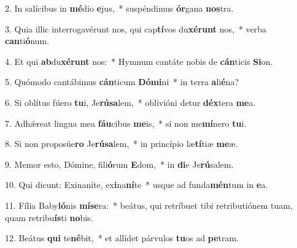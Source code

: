 2. In salícibus in \textbf{mé}dio \textbf{e}jus,~*  suspéndimus \textbf{ór}gana \textbf{nos}tra.\

3. Quia illic interrogavérunt nos, qui cap\textbf{tí}vos du\textbf{xé}\textbf{runt} nos,~*  verba \textbf{can}ti\textbf{ó}num.\

4. Et qui \textbf{ab}du\textbf{xé}\textbf{runt} nos:~*  Hymnum cantáte nobis de \textbf{cán}ticis \textbf{Si}on.\

5. Quómodo cantábimus \textbf{cán}ticum \textbf{Dó}\textbf{mi}ni~*  in terra \textbf{a}li\textbf{é}na?\

6. Si oblítus fúero \textbf{tu}i, Je\textbf{rú}\textbf{sa}lem,~*  oblivióni detur \textbf{déx}tera \textbf{me}a.\

7. Adhǽreat lingua mea \textbf{fáu}cibus \textbf{me}is,~*  si non me\textbf{mí}nero \textbf{tu}i.\

8. Si non proposúe\textbf{ro} Je\textbf{rú}\textbf{sa}lem,~*  in princípio læ\textbf{tí}tiæ \textbf{me}æ.\

9. Memor esto, Dómine, fili\textbf{ó}rum \textbf{E}dom,~*  in \textbf{di}e Je\textbf{rú}salem.\

10. Qui dicunt: Exinaníte, ex\textbf{i}na\textbf{ní}te~*  usque ad funda\textbf{mén}tum in \textbf{e}a.\

11. Fília Baby\textbf{ló}nis \textbf{mí}\textbf{se}ra:~*  beátus, qui retríbuet tibi retributiónem tuam, quam retribu\textbf{ís}ti \textbf{no}bis.\

12. Beátus \textbf{qui} te\textbf{né}bit,~*  et allídet párvulos \textbf{tu}os ad \textbf{pe}tram.\

